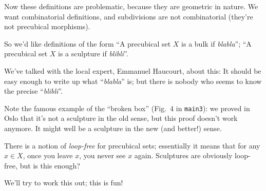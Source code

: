 \documentclass[a4paper,11pt]{article}
\begin{document}
Now these definitions are problematic, because they are geometric in
nature.  We want combinatorial definitions, and subdivisions are not
combinatorial (they're not precubical morphisms).

So we'd like definitions of the form ``A precubical set $X$ is a bulk
if \emph{blabla}''; ``A precubical set $X$ is a sculpture if
\emph{blibli}''.

We've talked with the local expert, Emmanuel Haucourt, about this: It
should be easy enough to write up what ``\emph{blabla}'' is; but there
is nobody who seems to know the precise ``\emph{blibli}''.

Note the famous example of the ``broken box'' (Fig.~4 in
\texttt{main3}): we proved in Oslo that it's not a sculpture in the
old sense, but this proof doesn't work anymore.  It might well be a
sculpture in the new (and better!) sense.

There is a notion of \emph{loop-free} for precubical sets; essentially
it means that for any $x\in X$, once you leave $x$, you never see $x$
again.  Sculptures are obviously loop-free, but is this enough?

We'll try to work this out; this is fun!
\end{document}
